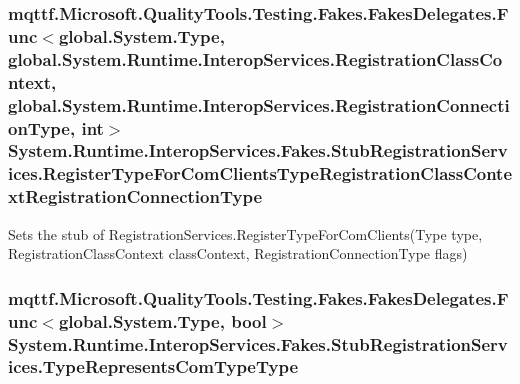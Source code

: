 \hypertarget{class_system_1_1_runtime_1_1_interop_services_1_1_fakes_1_1_stub_registration_services_a1c9e7948997542da5a8a8c3a24e56de7}{
\subsubsection[{Register\-Type\-For\-Com\-Clients\-Type\-Registration\-Class\-Context\-Registration\-Connection\-Type}]{\setlength{\rightskip}{0pt plus 5cm}mqttf.\-Microsoft.\-Quality\-Tools.\-Testing.\-Fakes.\-Fakes\-Delegates.\-Func$<$global.\-System.\-Type, global.\-System.\-Runtime.\-Interop\-Services.\-Registration\-Class\-Context, global.\-System.\-Runtime.\-Interop\-Services.\-Registration\-Connection\-Type, int$>$ System.\-Runtime.\-Interop\-Services.\-Fakes.\-Stub\-Registration\-Services.\-Register\-Type\-For\-Com\-Clients\-Type\-Registration\-Class\-Context\-Registration\-Connection\-Type}}\label{class_system_1_1_runtime_1_1_interop_services_1_1_fakes_1_1_stub_registration_services_a1c9e7948997542da5a8a8c3a24e56de7}


Sets the stub of Registration\-Services.\-Register\-Type\-For\-Com\-Clients(\-Type type, Registration\-Class\-Context class\-Context, Registration\-Connection\-Type flags)

\hypertarget{class_system_1_1_runtime_1_1_interop_services_1_1_fakes_1_1_stub_registration_services_ad2249c2b459aeedc0b75d0102a3b41ae}{
\subsubsection[{Type\-Represents\-Com\-Type\-Type}]{\setlength{\rightskip}{0pt plus 5cm}mqttf.\-Microsoft.\-Quality\-Tools.\-Testing.\-Fakes.\-Fakes\-Delegates.\-Func$<$global.\-System.\-Type, bool$>$ System.\-Runtime.\-Interop\-Services.\-Fakes.\-Stub\-Registration\-Services.\-Type\-Represents\-Com\-Type\-Type}}\label{class_system_1_1_runtime_1_1_interop_services_1_1_fakes_1_1_stub_registration_services_ad2249c2b459aeedc0b75d0102a3b41ae}


